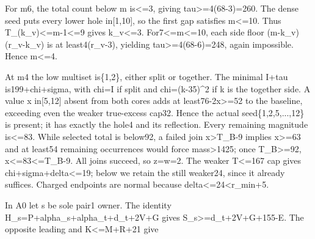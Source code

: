 \documentclass[10pt,a4paper]{article}
\theoremstyle{definition}
\begin{document}
For m6,\allowbreak{} the total count below m is\textless=\allowbreak{}3,\allowbreak{} giving
tau\textgreater=\allowbreak{}4(68-3)=\allowbreak{}260. The dense seed puts every lower hole
in{[}1,\allowbreak{}10{]},\allowbreak{} so the first gap satisfies m\textless=\allowbreak{}10. Thus
T\_\allowbreak{}(k\_\allowbreak{}v)\textless=\allowbreak{}m-1\textless=\allowbreak{}9 gives k\_\allowbreak{}v\textless=\allowbreak{}3.
For7\textless=\allowbreak{}m\textless=\allowbreak{}10,\allowbreak{} each side floor (m-k\_\allowbreak{}v)(r\_\allowbreak{}v-k\_\allowbreak{}v) is at
least4(r\_\allowbreak{}v-3),\allowbreak{} yielding tau\textgreater=\allowbreak{}4(68-6)=\allowbreak{}248,\allowbreak{} again impossible.
Hence m\textless=\allowbreak{}4.

At m4 the low multiset is\{1,\allowbreak{}2\},\allowbreak{} either split or together. The minimal
I+\allowbreak{}tau is199+\allowbreak{}chi+\allowbreak{}sigma,\allowbreak{} with chi=\allowbreak{}I if split and chi=\allowbreak{}(k-35)\^{}2 if k is
the together side. A value x in{[}5,\allowbreak{}12{]} absent from both cores adds at
least76-2x\textgreater=\allowbreak{}52 to the baseline,\allowbreak{} exceeding even the weaker
true-excess cap32. Hence the actual seed\{1,\allowbreak{}2,\allowbreak{}5,\allowbreak{}...,\allowbreak{}12\} is present; it
has exactly the hole4 and its reflection. Every remaining magnitude
is\textless=\allowbreak{}83. While selected total is below92,\allowbreak{} a failed join
x\textgreater T\_\allowbreak{}B-9 implies x\textgreater=\allowbreak{}63 and at least54 remaining
occurrences would force mass\textgreater1425; once T\_\allowbreak{}B\textgreater=\allowbreak{}92,\allowbreak{}
x\textless=\allowbreak{}83\textless=\allowbreak{}T\_\allowbreak{}B-9. All joins succeed,\allowbreak{} so z=\allowbreak{}w=\allowbreak{}2. The weaker
T\textless=\allowbreak{}167 cap gives chi+\allowbreak{}sigma+\allowbreak{}delta\textless=\allowbreak{}19; below we retain
the still weaker24,\allowbreak{} since it already suffices. Charged endpoints are
normal because delta\textless=\allowbreak{}24\textless r\_\allowbreak{}min+\allowbreak{}5.

In A0 let s be sole pair1 owner. The identity
H\_\allowbreak{}s=\allowbreak{}P+\allowbreak{}alpha\_\allowbreak{}s+\allowbreak{}alpha\_\allowbreak{}t+\allowbreak{}d\_\allowbreak{}t+\allowbreak{}2V+\allowbreak{}G gives
S\_\allowbreak{}s\textgreater=\allowbreak{}d\_\allowbreak{}t+\allowbreak{}2V+\allowbreak{}G+\allowbreak{}155-E. The opposite leading and
K\textless=\allowbreak{}M+\allowbreak{}R+\allowbreak{}21 give
\end{document}

